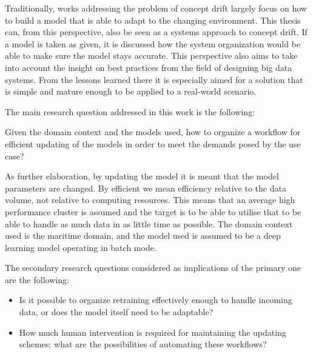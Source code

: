 Traditionally, works addressing the problem of concept drift largely focus on how to build a model that is able to adapt to the changing environment. This thesis can, from this perspective, also be seen as a systems approach to concept drift. If a model is taken as given, it is discussed how the system organization would be able to make sure the model stays accurate. This perspective also aims to take into account the insight on best practices from the field of designing big data systems. From the lessons learned there it is especially aimed for a solution that is simple and mature enough to be applied to a real-world scenario.




The main research question addressed in this work is the following:

\begin{center}
    Given the domain context and the models used, how to organize a workflow for efficient updating of the models in order to meet the demands posed by the use case?
\end{center}

As further elaboration, by updating the model it is meant that the model parameters are changed. By efficient we mean efficiency relative to the data volume, not relative to computing resources. This means that an average high performance cluster is assumed and the target is to be able to utilise that to be able to handle as much data in as little time as possible. The domain context used is the maritime domain, and the model used is assumed to be a deep learning model operating in batch mode.

The secondary research questions considered as implications of the primary one are the following:

\begin{itemize}
    \item Is it possible to organize retraining effectively enough to handle incoming data, or does the model itself need to be adaptable?
    \item How much human intervention is required for maintaining the updating schemes; what are the possibilities of automating these workflows?
\end{itemize}

